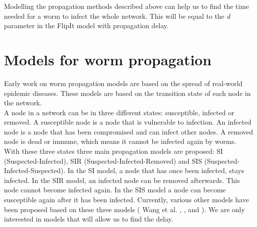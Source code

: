 \begin{description}
\end{description}

 Modelling the propagation methods described above can help us to find the time needed for a worm to infect the whole network. This will be equal to the \textit{d} parameter in the FlipIt model with propagation delay. \\

\section{Models for worm propagation}
\label{modelsforpropagation}
Early work on worm propagation models are based on the spread of real-world epidemic diseases. These models are based on the transition state of each node in the network.\\
A node in a network can be in three different states: susceptible, infected or removed. A susceptible node is a node that is vulnerable to infection. An infected node is a node that has been compromised and can infect other nodes. A removed node is dead or immune, which means it cannot be infected again by worms. With these three states three main propagation models are proposed: SI (Suspected-Infected), SIR (Suspected-Infected-Removed) and SIS (Suspected-Infected-Suspected). In the SI model, a node that has once been infected, stays infected. In the SIR model, an infected node can be removed afterwards. This node cannot become infected again. In the SIS model a node can become susceptible again after it has been infected. Currently, various other models have been proposed based on these three models ( Wang et al. \cite{wang2014modeling}, \cite{OnWorms2005survey}, \cite{xiang2009propagation} and \cite{serazzi2004computer}). We are only interested in models that will allow us to find the delay. \\ 

